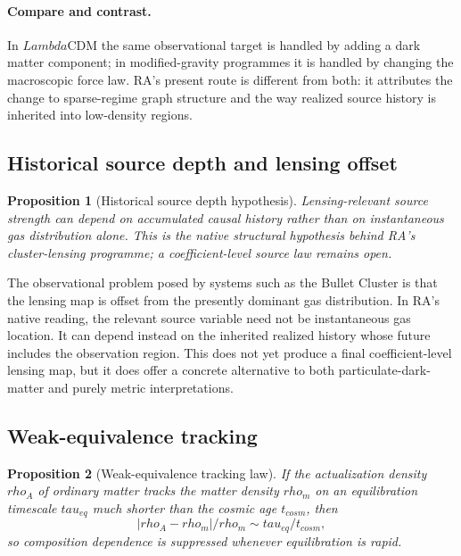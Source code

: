 \documentclass[11pt]{article}
\def\Lambda{Lambda}%
\def\rho{rho}%
\def\tau{tau}%
\def\mathrm#1{#1}%
\def\frac#1#2{#1/#2}%
\newtheorem{proposition}{Proposition}
\begin{document}
\paragraph{Compare and contrast.} In $\Lambda$CDM the same observational target is handled by adding a dark matter component; in modified-gravity programmes it is handled by changing the macroscopic force law. RA's present route is different from both: it attributes the change to sparse-regime graph structure and the way realized source history is inherited into low-density regions.

\subsection{Historical source depth and lensing offset}

\begin{proposition}[Historical source depth hypothesis]
Lensing-relevant source strength can depend on accumulated causal history rather than on instantaneous gas distribution alone. This is the native structural hypothesis behind RA's cluster-lensing programme; a coefficient-level source law remains open.
\end{proposition}

The observational problem posed by systems such as the Bullet Cluster is that the lensing map is offset from the presently dominant gas distribution. In RA's native reading, the relevant source variable need not be instantaneous gas location. It can depend instead on the inherited realized history whose future includes the observation region. This does not yet produce a final coefficient-level lensing map, but it does offer a concrete alternative to both particulate-dark-matter and purely metric interpretations.

\subsection{Weak-equivalence tracking}

\begin{proposition}[Weak-equivalence tracking law]
If the actualization density $\rho_A$ of ordinary matter tracks the matter density $\rho_m$ on an equilibration timescale $\tau_{\mathrm{eq}}$ much shorter than the cosmic age $t_{\mathrm{cosm}}$, then
\[
\frac{|\rho_A-\rho_m|}{\rho_m}\sim \frac{\tau_{\mathrm{eq}}}{t_{\mathrm{cosm}}},
\]
so composition dependence is suppressed whenever equilibration is rapid.
\end{proposition}
\end{document}
